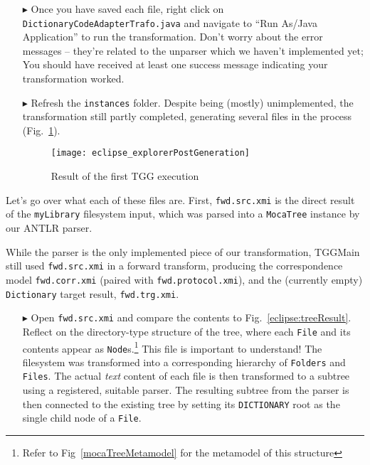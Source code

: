 \begin{itemize} 

\item[$\blacktriangleright$] Once you have saved each file, right click on \texttt{Dict\-ion\-ar\-y\-Code\-Ad\-ap\-ter\-Traf\-o.\-java} and navigate to ``Run
As/Java Application'' to run the transformation. Don't worry about the error messages -- they're related to the unparser which we haven't implemented yet; You
should have received at least one success message indicating your transformation worked.

\item[$\blacktriangleright$] Refresh the \texttt{instances} folder. Despite being (mostly) unimplemented, the transformation still partly completed, generating
several files in the process (Fig.~\ref{eclipse:postParse}).

\vspace{0.5cm}

\begin{figure}[!htbp]
\begin{center}
 \texttt{[image: eclipse\_explorerPostGeneration]}
  \caption{Result of the first TGG execution}
  \label{eclipse:postParse}
\end{center}
\end{figure} 

\end{itemize}

Let's go over what each of these files are. First, \texttt{fwd.src.xmi} is the direct result of the \texttt{my\-Lib\-rary} filesystem input, which was parsed
into a \texttt{MocaTree} instance by our ANTLR parser. 

While the parser is the only implemented piece of our transformation, TGG\-Main still used \texttt{fwd.src.xmi} in a forward transform, producing
the correspondence model \texttt{fwd.corr.xmi} (paired with \texttt{fwd.protocol.xmi}), and the (currently empty) \texttt{Dictionary} target result,
\texttt{fwd.trg.xmi}.

\begin{itemize}

\item[$\blacktriangleright$] Open \texttt{fwd.src.xmi} and compare the contents to Fig.~\ref{eclipse:treeResult}. Reflect on the directory-type structure of the
tree, where each \texttt{File} and its contents appear as \texttt{Node}s.\footnote{Refer to Fig~\ref{mocaTreeMetamodel} for the metamodel of this structure}
This file is important to understand!
The filesystem was transformed into a corresponding hierarchy of
\texttt{Folders} and \texttt{Files}. The actual \emph{text} content of each file is then transformed to a subtree using a registered, suitable parser. The resulting subtree from the parser is then connected to the existing tree by setting its \texttt{DICTIONARY} root as the single child node of a \texttt{File}.

\end{itemize}

